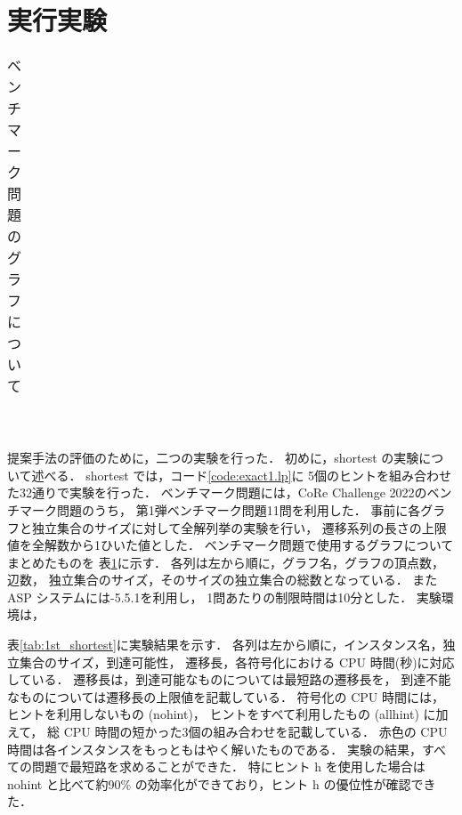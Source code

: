 \section{実行実験}\label{sec:experiment}

\begin{table}[tbp]
  \centering
  \caption{ベンチマーク問題のグラフについて}
  \begin{tabular}{lrrr|r}
    
  \end{tabular}
  \label{tab:graph}
\end{table}

\begin{table*}[tbp]
  \centering
  \caption{shortest の実験結果}
  \begin{tabular}{lr|lr|rrrrr}
    
  \end{tabular}
  \label{tab:1st_shortest}
\end{table*}

\begin{table*}[tbp]
  \centering
  \caption{longest の実験結果}
  \begin{tabular}{l|rrrrrrrr}
    
  \end{tabular}
  \label{tab:1st_longest}
\end{table*}

提案手法の評価のために，二つの実験を行った．
初めに，shortest の実験について述べる．
shortest では，コード\ref{code:exact1.lp}に
5個のヒントを組み合わせた32通りで実験を行った．
ベンチマーク問題には，CoRe Challenge 2022のベンチマーク問題のうち，
第1弾ベンチマーク問題11問を利用した．
事前に各グラフと独立集合のサイズに対して全解列挙の実験を行い，
遷移系列の長さの上限値を全解数から1ひいた値とした．
ベンチマーク問題で使用するグラフについてまとめたものを
表\ref{tab:graph}に示す．
各列は左から順に，グラフ名，グラフの頂点数，辺数，
独立集合のサイズ，そのサイズの独立集合の総数となっている．
また ASP システムには{\clingo}-5.5.1を利用し，
1問あたりの制限時間は10分とした．
実験環境は，

表\ref{tab:1st_shortest}に実験結果を示す．
各列は左から順に，インスタンス名，独立集合のサイズ，到達可能性，
遷移長，各符号化における CPU 時間(秒)に対応している．
遷移長は，到達可能なものについては最短路の遷移長を，
到達不能なものについては遷移長の上限値を記載している．
符号化の CPU 時間には，ヒントを利用しないもの (nohint)，
ヒントをすべて利用したもの (allhint) に加えて，
総 CPU 時間の短かった3個の組み合わせを記載している．
赤色の CPU 時間は各インスタンスをもっともはやく解いたものである．
実験の結果，すべての問題で最短路を求めることができた．
特にヒント h を使用した場合は nohint と比べて約90{\%}
の効率化ができており，ヒント h の優位性が確認できた．

